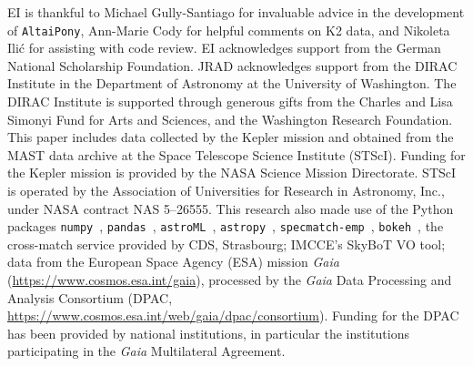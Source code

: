 \documentclass{aa}
\begin{document}
\begin{acknowledgements}
EI is thankful to Michael Gully-Santiago for invaluable advice in the development of \texttt{AltaiPony}, Ann-Marie Cody for helpful comments on K2 data, and Nikoleta Ilić for assisting with code review. EI acknowledges support from the German National Scholarship Foundation. JRAD acknowledges support from the DIRAC Institute in the Department of Astronomy at the University of Washington. The DIRAC Institute is supported through generous gifts from the Charles and Lisa Simonyi Fund for Arts and Sciences, and the Washington Research Foundation.
This paper includes data collected by the Kepler mission and obtained from the MAST data archive at the Space Telescope Science Institute (STScI). Funding for the Kepler mission is provided by the NASA Science Mission Directorate. STScI is operated by the Association of Universities for Research in Astronomy, Inc., under NASA contract NAS 5–26555.
This research also made use of the Python packages \texttt{numpy}~\citep{numpy2011}, \texttt{pandas}~\citep{pandas2010}, \texttt{astroML}~\citep{astroML2012, astroML2014}, \texttt{astropy}~\citep{astropy2013}, \texttt{specmatch-emp}~\citep{yee_specmatch_2017}, \texttt{bokeh}~\citep{bokeh}, the cross-match service provided by CDS, Strasbourg; IMCCE's SkyBoT VO tool; data from the European Space Agency (ESA) mission
{\it Gaia} (\url{https://www.cosmos.esa.int/gaia}), processed by the {\it Gaia}
Data Processing and Analysis Consortium (DPAC,
\url{https://www.cosmos.esa.int/web/gaia/dpac/consortium}). Funding for the DPAC
has been provided by national institutions, in particular the institutions
participating in the {\it Gaia} Multilateral Agreement.
\end{acknowledgements}

\end{document}
